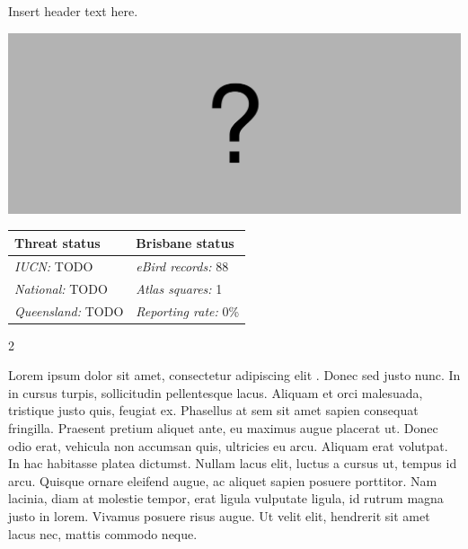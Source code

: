 \documentclass[12pt,openany,oneside]{book}
\let\origfigure\figure
\let\endorigfigure\endfigure
\renewenvironment{figure}[1][2] {
  \expandafter\origfigure\expandafter[H]
} {
  \endorigfigure
}
\let\Begin\begin
\let\End\end
\theoremstyle{definition}
\theoremstyle{definition}
\theoremstyle{definition}
\theoremstyle{remark}
\begin{document}

Insert header text here.

\begin{figure}
\centering
\includegraphics[width=\textwidth,keepaspectratio=true]{assets/misc/missing-profile.png}
\caption{Insert caption here.}
\end{figure}

\begin{tabu} to 
\toprule
Threat status & Brisbane status\\
\midrule
\textit{IUCN:} TODO & \textit{eBird records:} 88\\
\textit{National:} TODO & \textit{Atlas squares:} 1\\
\textit{Queensland:} TODO & \textit{Reporting rate:} 0\%\\
\bottomrule
\end{tabu} 
\vspace{0.15cm}

\Begin{multicols}{2}

Lorem ipsum dolor sit amet, consectetur adipiscing elit
\citep{rexample1, rexample2, rexample3}. Donec sed justo nunc. In in
cursus turpis, sollicitudin pellentesque lacus. Aliquam et orci
malesuada, tristique justo quis, feugiat ex. Phasellus at sem sit amet
sapien consequat fringilla. Praesent pretium aliquet ante, eu maximus
augue placerat ut. Donec odio erat, vehicula non accumsan quis,
ultricies eu arcu. Aliquam erat volutpat. In hac habitasse platea
dictumst. Nullam lacus elit, luctus a cursus ut, tempus id arcu. Quisque
ornare eleifend augue, ac aliquet sapien posuere porttitor. Nam lacinia,
diam at molestie tempor, erat ligula vulputate ligula, id rutrum magna
justo in lorem. Vivamus posuere risus augue. Ut velit elit, hendrerit
sit amet lacus nec, mattis commodo neque.

\End{multicols}

\clearpage
\end{document}
